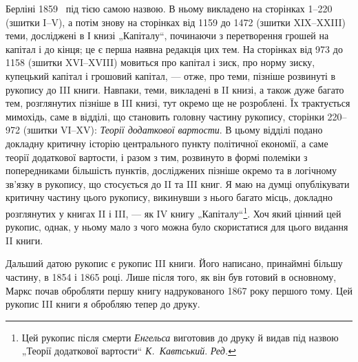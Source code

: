 \parcont{}  %
Берліні 1859~ під тією самою назвою. В ньому викладено на сторінках
1--220 (зшитки I--V), а потім знову на сторінках від 1159 до 1472
(зшитки XIX--XXIII) теми, досліджені в І книзі „Капіталу“, починаючи з
перетворення грошей на капітал і до кінця; це є перша наявна редакція
цих тем. На сторінках від 973 до 1158 (зшитки XVI--XVIII) мовиться
про капітал і зиск, про норму зиску, купецький капітал і грошовий капітал,
— отже, про теми, пізніше розвинуті в рукопису до III книги. Навпаки,
теми, викладені в II книзі, а також дуже багато тем, розглянутих
пізніше в III книзі, тут окремо ще не розроблені. Їх трактується мимохідь,
саме в відділі, що становить головну частину рукопису, сторінки
220--972 (зшитки VI--XV): \emph{Теорії додаткової вартости}. В цьому відділі
подано докладну критичну історію центрального пункту політичної
економії, а саме теорії додаткової вартости, і разом з тим, розвинуто в
формі полеміки з попередниками більшість пунктів, досліджених пізніше
окремо та в логічному зв’язку в рукопису, що стосується до II та III
книг. Я маю на думці опублікувати критичну частину цього рукопису,
викинувши з нього багато місць, докладно розглянутих у книгах II і
III, — як IV книгу „Капіталу“\footnote*{
Цей рукопис після смерти \emph{Енгельса} виготовив до друку й видав під назвою
„Теорії додаткової вартости“ \emph{К.~Кавтський}. \emph{Ред.}
}. Хоч який цінний цей рукопис, однак, у
ньому мало з чого можна було скористатися для цього видання II книги.

Дальший датою рукопис є рукопис III книги. Його написано, принаймні
більшу частину, в 1854 і 1865 році. Лише після того, як він
був готовий в основному, Маркс почав обробляти першу книгу надрукованого
1867 року першого тому. Цей рукопис III книги я обробляю
тепер до друку.

